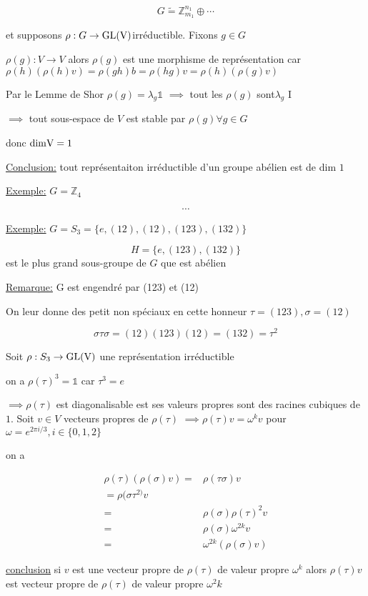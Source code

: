 \[ G \tilde = \mathds{Z}_{m_{1}}^{n_1}\oplus \dotsb \]

et supposons $\rho : G \to \rm{GL}(V)$irréductible. Fixons $g \in G$

$\rho(g): V \to V$ alors $\rho(g)$ est une morphisme de représentation car $\rho(h)(\rho(h) v) = \rho(gh) b = \rho(hg) v = \rho(h)(\rho(g)v)$

Par le Lemme de Shor $\rho(g) = \lambda_g \mathds{1}$
$\implies$ tout les $\rho(g)$ sont$\lambda_g$ I


$\implies$ tout sous-espace de $V$ est stable par $\rho(g) \forall g \in G$

donc $\rm{dim} V = 1$

\underline{Conclusion:} tout représentaiton irréductible d'un groupe abélien est de dim $1$ 

\underline{Exemple:} $G = \mathds{Z}_4$ 

\[ \dotsb \]


\underline{Exemple:} $G = S_3 = \{ e, (12), (12), (123),(132) \} $ 

\[ H = \{ e, (123), (132) \}  \] est le plus grand sous-groupe de $G$ que est abélien 

\underline{Remarque:} G est engendré par (123) et (12) 

On leur donne des petit non spéciaux en cette honneur $\tau =(123),\sigma= (12)$

\[ \sigma \tau \sigma  = (12)(123)(12) = (132) = \tau^2 \]


Soit $\rho: S_3 \to \rm{GL}(V)$ une représentation irréductible 

on a $\rho(\tau)^3 = \mathds{1} $ car $\tau^{3}= e$


$\implies \rho(\tau)$ est diagonalisable est ses valeurs propres sont des racines cubiques de $1$. Soit $v \in V$ vecteurs propres de $\rho(\tau)$ $\implies \rho(\tau) v = \omega^{k}v$ pour $ \omega = e^{2\pi i /3}, i \in \{ 0,1,2 \} $

on a 

\begin{align*}
	\rho(\tau) \left( \rho(\sigma) v \right) =& \rho (\tau \sigma) v \\ = \rho (\sigma \tau^{2)}v \\ = & \rho (\sigma) \rho(\tau)^2 v \\ =& \rho(\sigma) \omega^{2k} v \\ =& \omega^{2k} (\rho(\sigma) v )
\end{align*}

\underline{conclusion} si $v$ est une vecteur propre de $\rho(\tau)$ de valeur propre $\omega^{k}$ alors $\rho(\tau) v$ est vecteur propre de $ \rho(\tau)$ de valeur propre $\omega^{2}k$

